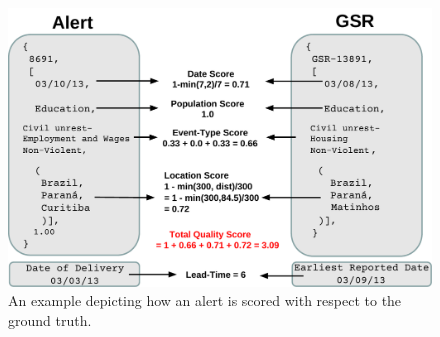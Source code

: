 \begin{figure}
\includegraphics[width=\columnwidth]{figures/cu/alert_vs_gsr.pdf}
\caption{An example depicting how an alert is scored with respect to the ground truth.}
\label{fig:alert}
\end{figure}

